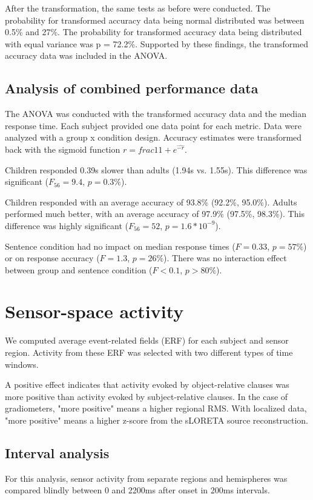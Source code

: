 After the transformation, the same tests as before were conducted.
The probability for transformed accuracy data being normal distributed was between 0.5\% and 27\%.
The probability for transformed accuracy data being distributed with equal variance was p = 72.2\%.
Supported by these findings, the transformed accuracy data was included in the ANOVA.

\subsection{Analysis of combined performance data}

The ANOVA was conducted with the transformed accuracy data and the median response time.
Each subject provided one data point for each metric.
Data were analyzed with a group x condition design.
Accuracy estimates were transformed back with the sigmoid function $r = frac{1}{1+e^{\hat{-r}}}$.

Children responded 0.39s slower than adults (1.94s vs. 1.55s).
This difference was significant ($F_{56} = 9.4$, $p = 0.3\%$).

Children responded with an average accuracy of 93.8\% (92.2\%, 95.0\%).
Adults performed much better, with an average accuracy of 97.9\% (97.5\%, 98.3\%).
This difference was highly significant ($F_{56} = 52$, $p = 1.6*10^{-9}$).

Sentence condition had no impact on median response times ($F = 0.33$, $p = 57\%$) or on response accuracy ($F = 1.3$, $p = 26\%$).
There was no interaction effect between group and sentence condition ($F < 0.1$, $p > 80\%$).

\section{Sensor-space activity}

We computed average event-related fields (ERF) for each subject and sensor region.
Activity from these ERF was selected with two different types of time windows.

A positive effect indicates that activity evoked by object-relative clauses was more positive than activity evoked by subject-relative clauses. In the case of gradiometers, "more positive" means a higher regional RMS. With localized data, "more positive" means a higher z-score from the sLORETA source reconstruction.


\subsection{Interval analysis}
For this analysis, sensor activity from separate regions and hemispheres was compared blindly between 0 and 2200ms after onset in 200ms intervals.

